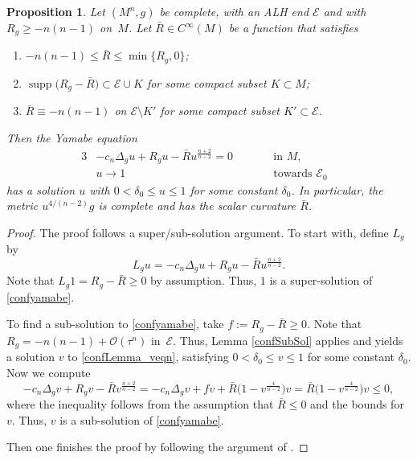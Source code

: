 \documentclass[10pt,a4paper]{amsart}
\numberwithin{equation}{section}
\newtheorem{Prop}[Theorem]{Proposition}
\def\Ecal{\mathcal{E}}
\def\Ocal{\mathcal{O}}
\def\supp{\operatorname{supp}}
\begin{document}
\begin{Prop}\label{conformdeform1}
Let $(M^n, g)$ be complete, with an ALH end $\Ecal$ and with
$R_g \ge - n(n-1)$ on~$M$.
Let $\bar R\in C^\infty(M)$ be a function that satisfies
\begin{enumerate}\itemsep=0pt
\item[$(a)$] $-n(n-1)\leq \bar R\leq \min\{R_g, 0\}$;
\item[$(b)$] $\supp \bigl(R_g - \bar R\bigr) \subset \Ecal \cup K$ for some compact subset $K\subset M$;
\item[$(c)$]  $\bar R \equiv -n(n-1)$ on $\Ecal \setminus K'$ for some compact subset $K'\subset \Ecal$.
\end{enumerate}
Then the Yamabe equation
\begin{alignat}{3}
            &-c_n \Delta_g u  + R_g u  - \bar R u^{\frac{n+2}{n-2}} = 0\qquad&&\mbox{in } M,&\nonumber\\
            &u \rightarrow 1 \qquad&&\mbox{towards } \Ecal_0&\label{confyamabe}
        \end{alignat}	
has a solution $u$ with $ 0<\delta_0\le u \le 1$ for some constant $\delta_0$.
In particular, the metric $u^{4/(n-2)} g$ is complete and has the scalar
curvature $\bar R$.
\end{Prop}
\begin{proof}
The proof follows a super/sub-solution argument. To start with, define $L_g$ by
\begin{equation*}
    L_g u = -c_n \Delta_g u + R_g u - \bar R u^{\frac{n+2}{n-2}}.
\end{equation*}
Note that $L_g 1 = R_g - \bar R\ge 0$ by assumption. Thus, $1$ is a super-solution of \eqref{confyamabe}.

To find a sub-solution to \eqref{confyamabe}, take $f := R_g - \bar R\ge 0$.
Note that $R_g = - n(n-1)+ \Ocal(\tau^{n})$ in~$\Ecal$.
Thus, Lemma \ref{confSubSol} applies and yields a solution $v$ to \eqref{confLemma_veqn}, satisfying $0<\delta_0\le v\le 1$ for some constant $\delta_0$. Now we compute
\begin{equation*}
    -c_n\Delta_g v + R_g v - \bar R v^{\frac{n+2}{n-2}}
    = - c_n \Delta_g v + fv + \bar R\bigl(1- v^{\frac{4}{n-2}}\bigr)v = \bar R\bigl(1- v^{\frac{4}{n-2}}\bigr)v\le 0,
\end{equation*}
where the inequality follows from the assumption that $\bar R\le 0$ and the bounds for $v$. Thus, $v$ is a sub-solution of \eqref{confyamabe}.

Then one finishes the proof by following the argument of \cite[Proposition 2.1]{AM88}.
\end{proof}
\end{document}
